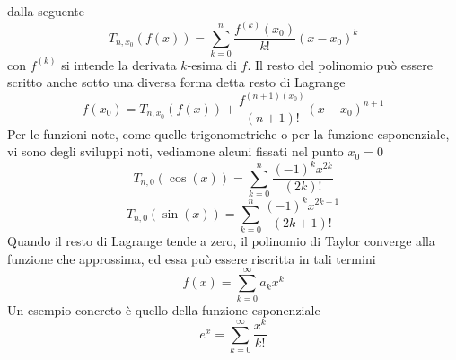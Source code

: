 \documentclass[10pt, letterpaper]{report}
\begin{document}
dalla seguente $$
    T_{n,x_0}(f(x))=\sum_{k=0}^n\dfrac{f^{(k)}(x_0)}{k!}(x-x_0)^k
$$
con $f^{(k)}$ si intende la derivata $k$-esima di $f$. Il resto del polinomio può essere scritto anche sotto
una diversa forma detta resto di Lagrange
$$f(x_0)=T_{n,x_0}(f(x))+\dfrac{f^{(n+1)(x_0)}}{(n+1)!}(x-x_0)^{n+1}$$
Per le funzioni note, come quelle
trigonometriche o per la funzione esponenziale, vi sono degli sviluppi noti, vediamone alcuni
fissati nel punto $x_0=0$
$$
    T_{n,0}(\cos(x))=\sum_{k=0}^n\dfrac{(-1)^kx^{2k}}{(2k)!}
$$$$
    T_{n,0}(\sin(x))=\sum_{k=0}^n\dfrac{(-1)^kx^{2k+1}}{(2k+1)!}
$$
Quando il resto di Lagrange tende a zero, il polinomio di Taylor converge alla funzione che
approssima, ed essa può essere riscritta in tali termini
$$ f(x)=\sum_{k=0}^\infty a_kx^k$$
Un esempio concreto è quello della funzione esponenziale
$$ e^x=\sum_{k=0}^\infty \dfrac{x^k}{k!}$$
\end{document}
